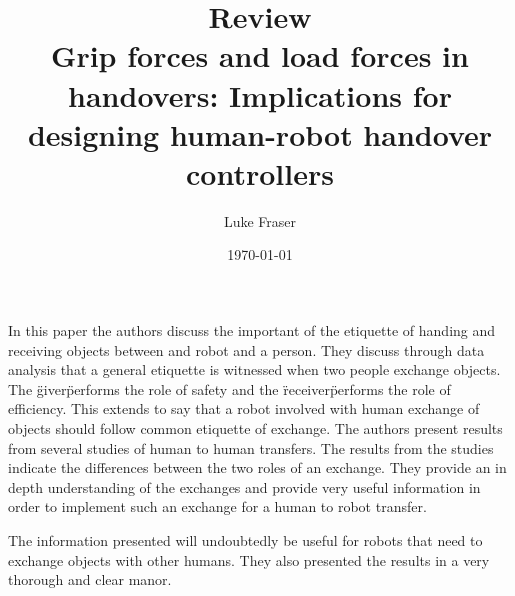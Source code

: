 \documentclass{article}
\begin{document}
\title{{\large Review} \\ Grip forces and load forces in handovers: Implications for designing human-robot handover controllers}
\author{Luke Fraser}
\date{\today}
\maketitle

\begingroup
\renewcommand{\section}[2]{}


\endgroup

\section*{Summary}
In this paper the authors discuss the important of the etiquette of handing and receiving objects between and robot and a person. They discuss through data analysis that a general etiquette is witnessed when two people exchange objects. The \"giver\" performs the role of safety and the \"receiver\" performs the role of efficiency. This extends to say that a robot involved with human exchange of objects should follow common etiquette of exchange. The authors present results from several studies of human to human transfers. The results from the studies indicate the differences between the two roles of an exchange. They provide an in depth understanding of the exchanges and provide very useful information in order to implement such an exchange for a human to robot transfer.
\section*{Strengths}
The information presented will undoubtedly be useful for robots that need to exchange objects with other humans. They also presented the results in a very thorough and clear manor.
\end{document}
